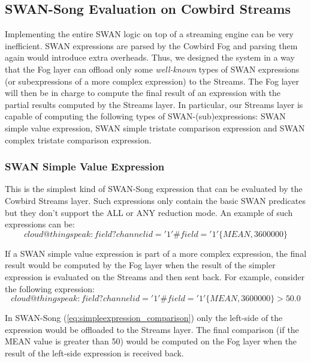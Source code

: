 \subsection{SWAN-Song Evaluation on Cowbird Streams}
Implementing the entire SWAN logic on top of a streaming engine can be very inefficient. SWAN expressions are parsed by the Cowbird Fog and parsing them again would introduce extra overheads. 
Thus, we designed the system in a way that the Fog layer can offload only some \emph{well-known} types of SWAN expressions (or subexpressions of a more complex expression) to the Streams. The Fog layer will then be in charge to compute the final result of an expression with the partial results computed by the Streams layer. In particular, our Streams layer is capable of computing the following types of SWAN-(sub)expressions: SWAN simple value expression, SWAN simple tristate comparison expression and SWAN complex tristate comparison expression. 

\subsubsection{SWAN Simple Value Expression} 
This is the simplest kind of SWAN-Song expression that can be evaluated by the Cowbird Streams layer. Such expressions only contain the basic SWAN predicates but they don't support the ALL or ANY reduction mode. An example of such expressions can be:
\begin{equation}\label{eq:simpleexpression}
cloud@thingspeak:field?channelid='1'\#field='1'\big\{MEAN,3600000\big\}
\end{equation}

If a SWAN simple value expression is part of a more complex expression, the final result would be computed by the Fog layer when the result of the simpler expression is evaluated on the Streams and then sent back. For example, consider the following expression:
\begin{equation}\label{eq:simpleexpression_comparison}
cloud@thingspeak:field?channelid='1'\#field='1'\big\{MEAN,3600000\big\} > 50.0
\end{equation}

In SWAN-Song (\ref{eq:simpleexpression_comparison}) only the left-side of the expression would be offloaded to the Streams layer. The final comparison (if the MEAN value is greater than 50) would be computed on the Fog layer when the result of the left-side expression is received back.

